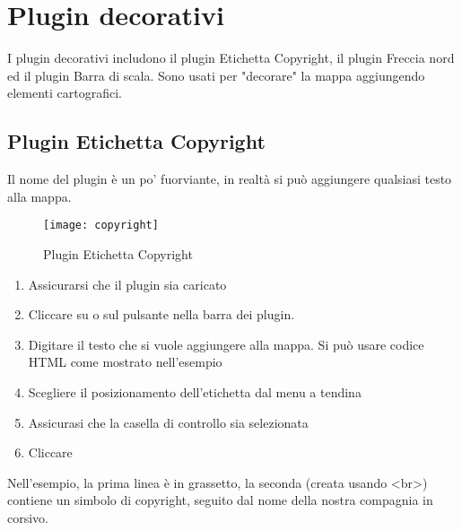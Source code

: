
\section{Plugin decorativi}


I plugin decorativi includono il plugin Etichetta Copyright, il plugin Freccia nord ed il plugin 
Barra di scala. Sono usati per "decorare" la mappa aggiungendo elementi cartografici.

\subsection{Plugin Etichetta Copyright}\label{copyrightlabel}

Il nome del plugin è un po' fuorviante, in realtà si può aggiungere qualsiasi testo alla mappa.

\begin{figure}[ht]
   \centering
   \texttt{[image: copyright]}
   \caption{Plugin Etichetta Copyright \wincaption}\label{fig:copyright}
\end{figure}

\begin{enumerate}
\item Assicurarsi che il plugin sia caricato
\item Cliccare su  \arrow {} \arrow {} 
o sul pulsante  nella barra dei plugin.
\item Digitare il testo che si vuole aggiungere alla mappa. Si può usare codice HTML come mostrato nell'esempio
\item Scegliere il posizionamento dell'etichetta dal menu a tendina 
\item Assicurasi che la casella di controllo  sia selezionata
\item Cliccare  
\end{enumerate}

Nell'esempio, la prima linea è in grassetto, la seconda (creata usando \textless br\textgreater) 
contiene un simbolo di copyright, seguito dal nome della nostra compagnia in corsivo.

